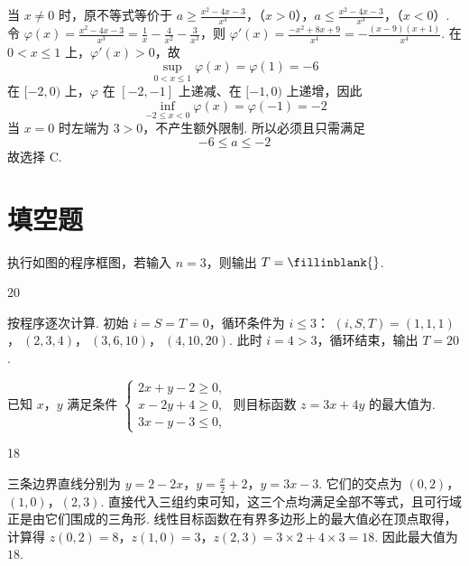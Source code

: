 \begin{solution}
当 \(x\neq0\) 时，原不等式等价于
\(a\geqslant\frac{x^{2}-4x-3}{x^{3}}\)，（\(x>0\)），\(a\leqslant\frac{x^{2}-4x-3}{x^{3}}\)，（\(x<0\)）.
令 \(\varphi(x)=\frac{x^{2}-4x-3}{x^{3}}=\frac1x-\frac4{x^{2}}-\frac3{x^{3}}\)，则
\(\varphi'(x)=\frac{-x^{2}+8x+9}{x^{4}}=-\frac{(x-9)(x+1)}{x^{4}}\).
在 \(0<x\leqslant1\) 上，\(\varphi'(x)>0\)，故
\[
\sup_{0<x\leqslant1}\varphi(x)=\varphi(1)=-6
\]
在 \([-2,0)\) 上，\(\varphi\) 在 \([-2,-1]\) 上递减、在 \([-1,0)\) 上递增，因此
\[
\inf_{-2\leqslant x<0}\varphi(x)=\varphi(-1)=-2
\]
当 \(x=0\) 时左端为 \(3>0\)，不产生额外限制. 所以必须且只需满足
\[
-6\leqslant a\leqslant-2
\]
故选择 C.
\end{solution}

\section{填空题}

\begin{problem}
执行如图的程序框图，若输入 \(n = 3\)，则输出 \(T =\fillinblank{}\).

\end{problem}

\begin{answer}
20
\end{answer}

\begin{solution}
按程序逐次计算. 初始 \(i=S=T=0\)，循环条件为 \(i\leqslant3\)：
\((i,S,T)=(1,1,1)\)，\(\ (2,3,4)\)，\(\ (3,6,10)\)，\(\ (4,10,20)\).
此时 \(i=4>3\)，循环结束，输出 \(T=20\).
\end{solution}

\begin{problem}
已知 \(x\)，\(y\) 满足条件 \(\begin{cases}
2x + y - 2 \geqslant 0,\\
x - 2y + 4 \geqslant 0,\\
3x - y - 3 \leqslant 0,
\end{cases}\) 则目标函数 \(z = 3x + 4y\) 的最大值为\fillinblank{}.
\end{problem}

\begin{answer}
18
\end{answer}

\begin{solution}
三条边界直线分别为
\(y=2-2x\)，\(y=\frac{x}{2}+2\)，\(y=3x-3\).
它们的交点为
\((0,2)\)，\((1,0)\)，\((2,3)\).
直接代入三组约束可知，这三个点均满足全部不等式，且可行域正是由它们围成的三角形. 线性目标函数在有界多边形上的最大值必在顶点取得，计算得
\(z(0,2)=8\)，\(z(1,0)=3\)，\(z(2,3)=3\times2+4\times3=18\).
因此最大值为 \(18\).
\end{solution}

